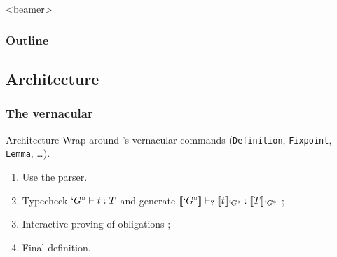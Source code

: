 \section{\Program}
\begin{frame}<beamer>
  \frametitle{Outline}
  \tableofcontents[currentsection]
\end{frame}

\subsection{Architecture}
\begin{frame}[t]
  \frametitle{The \Program vernacular}
  
  \begin{block}{Architecture}
    Wrap around \Coq{}'s vernacular commands (\texttt{Definition},
    \texttt{Fixpoint}, \texttt{Lemma}, \ldots).
    
    \begin{enumerate}
    \item<2-> Use the \Coq{} parser.
    \item<3-> Typecheck $`G^{\circ} \vdash t : T$ and generate
      $\llbracket `G^{\circ} \rrbracket \vdash_{?} \llbracket t \rrbracket_{`G^{\circ}} : \llbracket T \rrbracket_{`G^{\circ}}$ ;
    \item<4-> Interactive proving of obligations ;
    \item<5-> Final definition.
    \end{enumerate}
  \end{block}
  
  
\end{frame}

